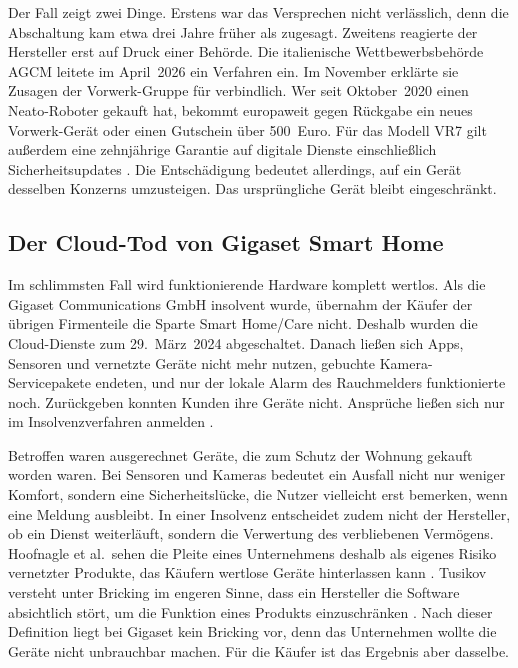 Der Fall zeigt zwei Dinge. Erstens war das Versprechen nicht verlässlich, denn die Abschaltung kam etwa drei Jahre früher als zugesagt. Zweitens reagierte der
Hersteller erst auf Druck einer Behörde. Die italienische Wettbewerbsbehörde
\acrshort{AGCM} leitete im April~2026 ein Verfahren ein. Im November erklärte
sie Zusagen der Vorwerk-Gruppe für verbindlich. Wer seit Oktober~2020 einen
Neato-Roboter gekauft hat, bekommt europaweit gegen Rückgabe ein neues
Vorwerk-Gerät oder einen Gutschein über 500~Euro. Für das Modell VR7 gilt
außerdem eine zehnjährige Garantie auf digitale Dienste einschließlich
Sicherheitsupdates \cite{agcm:2026b}. Die Entschädigung bedeutet allerdings,
auf ein Gerät desselben Konzerns umzusteigen. Das ursprüngliche Gerät bleibt
eingeschränkt.

\subsection{Der Cloud-Tod von Gigaset Smart Home}\label{sec:cloud-gigaset}

Im schlimmsten Fall wird funktionierende Hardware komplett wertlos. Als die
Gigaset Communications GmbH insolvent wurde, übernahm der Käufer der übrigen
Firmenteile die Sparte Smart Home/Care nicht. Deshalb wurden die Cloud-Dienste
zum 29.~März~2024 abgeschaltet. Danach ließen sich Apps, Sensoren und vernetzte
Geräte nicht mehr nutzen, gebuchte Kamera-Servicepakete endeten, und nur der
lokale Alarm des Rauchmelders funktionierte noch. Zurückgeben konnten Kunden
ihre Geräte nicht. Ansprüche ließen sich nur im Insolvenzverfahren anmelden
\cite{gigaset:2024a}.

Betroffen waren ausgerechnet Geräte, die zum Schutz der Wohnung gekauft worden
waren. Bei Sensoren und Kameras bedeutet ein Ausfall nicht nur weniger Komfort,
sondern eine Sicherheitslücke, die Nutzer vielleicht erst bemerken, wenn eine
Meldung ausbleibt. In einer Insolvenz entscheidet zudem nicht der Hersteller,
ob ein Dienst weiterläuft, sondern die Verwertung des verbliebenen Vermögens.
Hoofnagle et al.\ sehen die Pleite eines Unternehmens deshalb als eigenes Risiko
vernetzter Produkte, das Käufern wertlose Geräte hinterlassen kann
\cite[S.~816]{hoofnagle:2019}. Tusikov versteht unter Bricking im engeren Sinne,
dass ein Hersteller die Software absichtlich stört, um die Funktion eines
Produkts einzuschränken \cite[S.~2]{tusikov:2019}. Nach dieser Definition liegt
bei Gigaset kein Bricking vor, denn das Unternehmen wollte die Geräte nicht
unbrauchbar machen. Für die Käufer ist das Ergebnis aber dasselbe.

